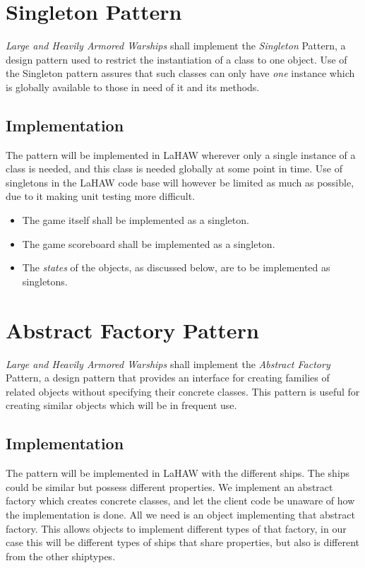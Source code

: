     \section{Singleton Pattern}
    \emph{Large and Heavily Armored Warships} shall implement the \emph{Singleton} Pattern, a design pattern used to restrict the instantiation of a class to one object\cite{singleton}.
    Use of the Singleton pattern assures that such classes can only have \emph{one} instance which is globally available to those in need of it and its methods.
    
        \subsection{Implementation}
        The pattern will be implemented in LaHAW wherever only a single instance of a class is needed, and this class is needed globally at some point in time. Use of singletons in the LaHAW code base will however be limited as much as possible, due to it making unit testing more difficult\cite{singleton_unit_testing}.
    
        \begin{itemize}
            \item The game itself shall be implemented as a singleton.
            \item The game scoreboard shall be implemented as a singleton.
            \item The \emph{states} of the objects, as discussed below, are to be implemented as singletons.
        \end{itemize}
    
    

\section{Abstract Factory Pattern}
\emph{Large and Heavily Armored Warships} shall implement the \emph{Abstract Factory} Pattern, a design pattern that provides an interface for creating families of related objects without specifying their concrete classes\cite{abstractfactory}. This pattern is useful for creating similar objects which will be in frequent use.


    \subsection{Implementation}
    The pattern will be implemented in LaHAW with the different ships. The ships could be similar but possess different properties. We implement an abstract factory which creates concrete classes, and let the client code be unaware of how the implementation is done. All we need is an object implementing that abstract factory. This allows objects to implement different types of that factory, in our case this will be different types of ships that share properties, but also is different from the other shiptypes.

